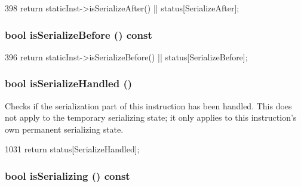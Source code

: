 \begin{DoxyCode}
398     { return staticInst->isSerializeAfter() || status[SerializeAfter]; }
\end{DoxyCode}
\hypertarget{classInOrderDynInst_aa350b74ea660b6821bd37cd139bd917b}{
\subsubsection[{isSerializeBefore}]{\setlength{\rightskip}{0pt plus 5cm}bool isSerializeBefore () const}}
\label{classInOrderDynInst_aa350b74ea660b6821bd37cd139bd917b}



\begin{DoxyCode}
396     { return staticInst->isSerializeBefore() || status[SerializeBefore]; }
\end{DoxyCode}
\hypertarget{classInOrderDynInst_a33db384950219c3c71206fbb2c7d8025}{
\subsubsection[{isSerializeHandled}]{\setlength{\rightskip}{0pt plus 5cm}bool isSerializeHandled ()}}
\label{classInOrderDynInst_a33db384950219c3c71206fbb2c7d8025}
Checks if the serialization part of this instruction has been handled. This does not apply to the temporary serializing state; it only applies to this instruction's own permanent serializing state. 


\begin{DoxyCode}
1031 { return status[SerializeHandled]; }
\end{DoxyCode}
\hypertarget{classInOrderDynInst_a0b876c794e1ed62f664670215da8793f}{
\subsubsection[{isSerializing}]{\setlength{\rightskip}{0pt plus 5cm}bool isSerializing () const}}
\label{classInOrderDynInst_a0b876c794e1ed62f664670215da8793f}



